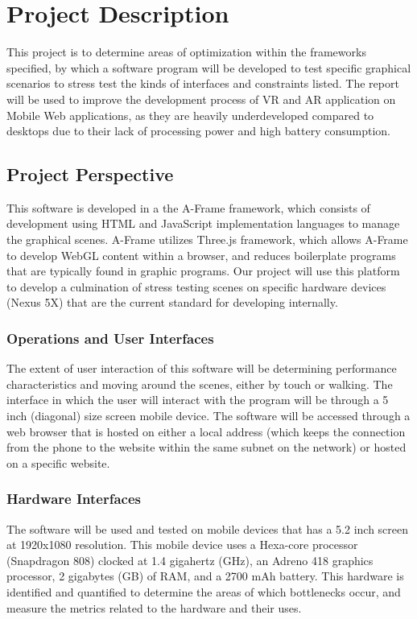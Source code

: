 \documentclass[letterpaper,10pt,titlepage,draftclsnofoot,onecolumn,compsoc,utf8,latin1]{IEEEtran}
\begin{document}
\section{Project Description}
\begin{singlespace}
\noindent
This project is to determine areas of optimization within the frameworks specified, by which a software program will be developed to test specific graphical scenarios to stress test the kinds of interfaces and constraints listed. The report will be used to improve the development process of VR and AR application on Mobile Web applications, as they are heavily underdeveloped compared to desktops due to their lack of processing power and high battery consumption.

\subsection{Project Perspective}
\begin{singlespace}
\noindent
This software is developed in a the A-Frame framework, which consists of development using HTML and JavaScript implementation languages to manage the graphical scenes. A-Frame utilizes Three.js framework, which allows A-Frame to develop WebGL content within a browser, and reduces boilerplate programs that are  typically found in graphic programs. Our project will  use this platform to develop a culmination of stress testing scenes on specific hardware devices (Nexus 5X) that are the current standard for developing internally.
\end{singlespace}

\subsubsection{Operations and User Interfaces}
\begin{singlespace}
\noindent
The extent of user interaction of this software will be determining performance characteristics and moving around the scenes, either by touch or walking. The interface in which the user will interact with the program will be through a 5 inch (diagonal) size screen mobile device. The software will be accessed through a web browser that is hosted on either a local address (which keeps the connection from the phone to the website within the same subnet on the network) or hosted on a specific website.
\end{singlespace}

\subsubsection{Hardware Interfaces}
\begin{singlespace}
\noindent
The software will be used and tested on mobile devices that has a 5.2 inch screen at 1920x1080 resolution. This mobile device uses a Hexa-core processor (Snapdragon 808) clocked at 1.4 gigahertz (GHz), an Adreno 418 graphics processor, 2 gigabytes (GB) of RAM, and a 2700 mAh battery. This hardware is identified and quantified to determine the areas of which bottlenecks occur, and measure the metrics related to the hardware and their uses.
\end{singlespace}


\end{singlespace}
\end{document}
